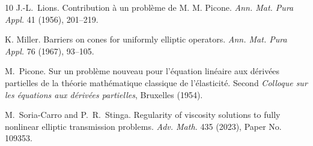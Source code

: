 \documentclass[letter,11pt]{amsart}
\theoremstyle{definition}
\numberwithin{equation}{section}
\begin{document}
\begin{thebibliography}{10}
J.-L.~Lions.
Contribution \`{a} un probl\`{e}me de M. M. Picone.
\textit{Ann. Mat. Pura Appl.} 41 (1956), 201--219.

K. Miller.
Barriers on cones for uniformly elliptic operators.
\textit{Ann. Mat. Pura Appl.} 76 (1967), 93--105.

M.~Picone.
Sur un probl\`{e}me nouveau pour l'\'{e}quation lin\'{e}aire aux d\'{e}riv\'{e}es partielles de la th\'{e}orie math\'{e}matique classique de l'\'{e}lasticit\'{e}.
Second \textit{Colloque sur les \'{e}quations aux d\'{e}riv\'{e}es partielles}, Bruxelles (1954).

M.~Soria-Carro and P.~R.~Stinga.
Regularity of viscosity solutions to fully nonlinear elliptic transmission problems.
\textit{Adv. Math.} 435 (2023), Paper No. 109353.

\end{thebibliography}
\end{document}
